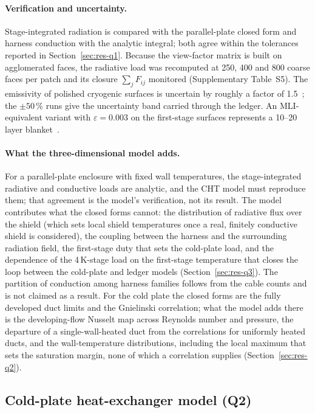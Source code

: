 \documentclass[preprint,12pt]{elsarticle}
\begin{document}
\paragraph{Verification and uncertainty.} Stage-integrated radiation is compared with the
parallel-plate closed form and harness conduction with the analytic integral; both agree
within the tolerances reported in Section~\ref{sec:res-q1}. Because the view-factor matrix is
built on agglomerated faces, the radiative load was recomputed at 250, 400 and 800 coarse
faces per patch and its closure $\sum_jF_{ij}$ monitored (Supplementary Table~S5). The
emissivity of polished cryogenic surfaces is uncertain by roughly a factor of
1.5~\cite{27-Ekin2006Experimental}; the $\pm50$\,\% runs give the uncertainty band carried
through the ledger. An MLI-equivalent variant with $\varepsilon=0.003$ on the first-stage surfaces
represents a 10--20 layer blanket~\cite{Shu1986MLI, 21-Weisend2016Cryostat}.

\paragraph{What the three-dimensional model adds.} For a parallel-plate enclosure with fixed
wall temperatures, the stage-integrated radiative and conductive loads are analytic, and the
CHT model must reproduce them; that agreement is the model's verification, not its result. The
model contributes what the closed forms cannot: the distribution of radiative flux over the
shield (which sets local shield temperatures once a real, finitely conductive shield is
considered), the coupling between the harness and the surrounding radiation field, the
first-stage duty that sets the cold-plate load, and the dependence of the 4\,K-stage load on
the first-stage temperature that closes the loop between the cold-plate and ledger models
(Section~\ref{sec:res-q3}). The partition of conduction among harness families follows from
the cable counts and is not claimed as a result. For the cold plate the closed forms are the fully developed duct limits and
the Gnielinski correlation; what the model adds there is the developing-flow Nusselt map
across Reynolds number and pressure, the departure of a single-wall-heated duct from the
correlations for uniformly heated ducts, and the wall-temperature distributions, including the
local maximum that sets the saturation margin, none of which a correlation
supplies (Section~\ref{sec:res-q2}).

\subsection{Cold-plate heat-exchanger model (Q2)}
\label{sec:hx}
\end{document}
